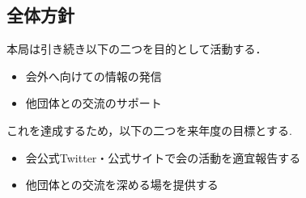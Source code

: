 \subsection*{全体方針}

本局は引き続き以下の二つを目的として活動する．
\begin{itemize}
    \item 会外へ向けての情報の発信
    \item 他団体との交流のサポート
\end{itemize}
これを達成するため，以下の二つを来年度の目標とする.
\begin{itemize}
  \item 会公式Twitter・公式サイトで会の活動を適宜報告する
  \item 他団体との交流を深める場を提供する
\end{itemize}
